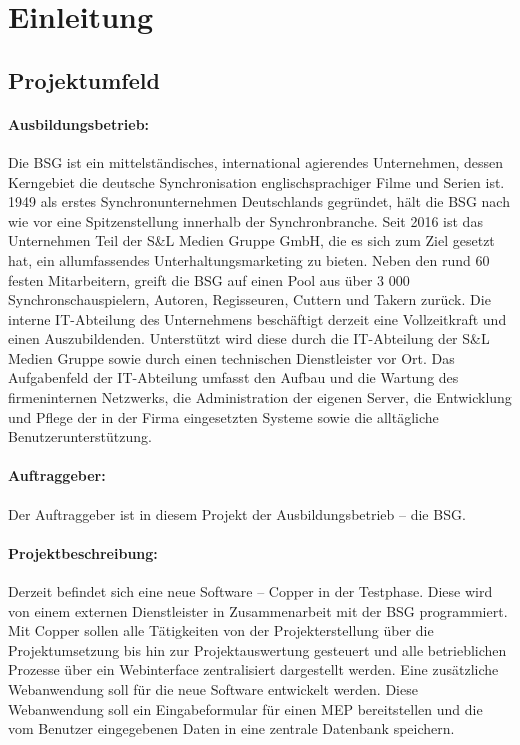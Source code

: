 
\nocite{*}
\section{Einleitung}
\label{sec:Einleitung}
\subsection{Projektumfeld} 
\label{sec:Projektumfeld}
\paragraph*{Ausbildungsbetrieb: } Die \ac{BSG} ist ein mittelständisches, international agierendes Unternehmen, dessen Kerngebiet die deutsche Synchronisation englischsprachiger Filme und Serien ist. 1949 als erstes Synchronunternehmen Deutschlands gegründet, hält die \ac{BSG} nach wie vor eine Spitzenstellung innerhalb der Synchronbranche. Seit 2016 ist das Unternehmen Teil der S\&L Medien Gruppe GmbH, die es sich zum Ziel gesetzt hat, ein allumfassendes Unterhaltungsmarketing zu bieten. Neben den rund 60 festen Mitarbeitern, greift die \ac{BSG} auf einen Pool aus über 3 000 Synchronschauspielern, Autoren, Regisseuren, Cuttern und Takern zurück. Die interne IT-Abteilung des Unternehmens beschäftigt derzeit eine Vollzeitkraft und einen Auszubildenden. Unterstützt wird diese durch die IT-Abteilung der S\&L Medien Gruppe sowie durch einen technischen Dienstleister vor Ort. Das Aufgabenfeld der IT-Abteilung umfasst den Aufbau und die Wartung des firmeninternen Netzwerks, die Administration der eigenen Server, die Entwicklung und Pflege der in der Firma eingesetzten Systeme sowie die alltägliche Benutzerunterstützung.

\paragraph*{Auftraggeber: } Der Auftraggeber ist in diesem Projekt der Ausbildungsbetrieb – die \ac{BSG}.

\paragraph*{Projektbeschreibung: }Derzeit befindet sich eine neue Software – Copper in der Testphase. Diese wird von einem externen Dienstleister in Zusammenarbeit mit der \ac{BSG} programmiert. Mit Copper sollen alle Tätigkeiten von der Projekterstellung über die Projektumsetzung bis hin zur Projektauswertung gesteuert und alle betrieblichen Prozesse über ein Webinterface zentralisiert dargestellt werden. Eine zusätzliche Webanwendung soll für die neue Software entwickelt werden. Diese Webanwendung soll ein Eingabeformular für einen \ac{MEP} bereitstellen und die vom Benutzer eingegebenen Daten in eine zentrale Datenbank speichern.

